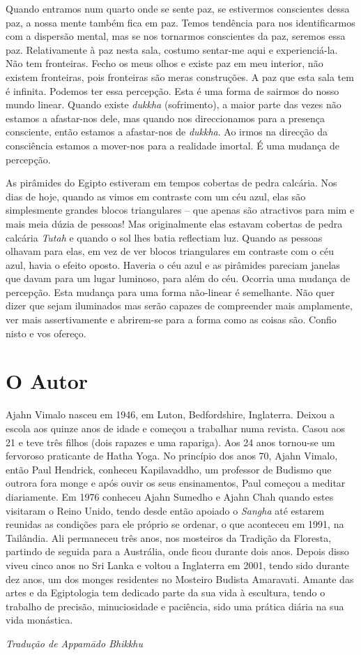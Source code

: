 Quando entramos num quarto onde se sente paz, se estivermos conscientes
dessa paz, a nossa mente também fica em paz. Temos tendência para nos
identificarmos com a dispersão mental, mas se nos tornarmos conscientes
da paz, seremos essa paz. Relativamente à paz nesta sala, costumo
sentar-me aqui e experienciá-la. Não tem fronteiras. Fecho os meus olhos
e existe paz em meu interior, não existem fronteiras, pois fronteiras
são meras construções. A paz que esta sala tem é infinita. Podemos ter
essa percepção. Esta é uma forma de sairmos do nosso mundo linear.
Quando existe \emph{dukkha} (sofrimento), a maior parte das vezes não
estamos a afastar-nos dele, mas quando nos direccionamos para a presença
consciente, então estamos a afastar-nos de \emph{dukkha}. Ao irmos na
direcção da consciência estamos a mover-nos para a realidade imortal. É
uma mudança de percepção.

As pirâmides do Egipto estiveram em tempos cobertas de pedra calcária.
Nos dias de hoje, quando as vimos em contraste com um céu azul, elas são
simplesmente grandes blocos triangulares -- que apenas são atractivos
para mim e mais meia dúzia de pessoas! Mas originalmente elas estavam
cobertas de pedra calcária \emph{Tutah} e quando o sol lhes batia
reflectiam luz. Quando as pessoas olhavam para elas, em vez de ver
blocos triangulares em contraste com o céu azul, havia o efeito oposto.
Haveria o céu azul e as pirâmides pareciam janelas que davam para um
lugar luminoso, para além do céu. Ocorria uma mudança de percepção. Esta
mudança para uma forma não-linear é semelhante. Não quer dizer que sejam
iluminados mas serão capazes de compreender mais amplamente, ver mais
assertivamente e abrirem-se para a forma como as coisas são. Confio
nisto e vos ofereço.

\section{O Autor}
 
Ajahn Vimalo nasceu em 1946, em Luton, Bedfordshire, Inglaterra. Deixou
a escola aos quinze anos de idade e começou a trabalhar numa revista.
Casou aos 21 e teve três filhos (dois rapazes e uma rapariga). Aos 24
anos tornou-se um fervoroso praticante de Hatha Yoga. No princípio dos
anos 70, Ajahn Vimalo, então Paul Hendrick, conheceu Kapilavaddho, um
professor de Budismo que outrora fora monge e após ouvir os seus
ensinamentos, Paul começou a meditar diariamente. Em 1976 conheceu Ajahn
Sumedho e Ajahn Chah quando estes visitaram o Reino Unido, tendo desde
então apoiado o \emph{Sangha} até estarem reunidas as condições para ele
próprio se ordenar, o que aconteceu em 1991, na Tailândia. Ali
permaneceu três anos, nos mosteiros da Tradição da Floresta, partindo de
seguida para a Austrália, onde ficou durante dois anos. Depois disso
viveu cinco anos no Sri Lanka e voltou a Inglaterra em 2001, tendo sido
durante dez anos, um dos monges residentes no Mosteiro Budista
Amaravati. Amante das artes e da Egiptologia tem dedicado parte da sua
vida à escultura, tendo o trabalho de precisão, minuciosidade e
paciência, sido uma prática diária na sua vida monástica.

\bigskip

{\raggedleft\itshape
  Tradução de Appamādo Bhikkhu
\par}

